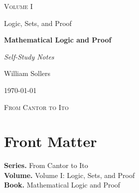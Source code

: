 \documentclass[12pt, a4paper]{report}
\begin{document}
\ExplSyntaxOff
\renewcommand{\familydefault}{\rmdefault}

\begin{titlepage}
\centering
\vspace*{3.5cm}

{\Large\scshape Volume I\par}
\vspace{0.35cm}
{\large Logic, Sets, and Proof\par}

\vspace{1.4cm}

{\Huge\bfseries Mathematical Logic and Proof\par}

\vspace{0.6cm}
{\large\itshape Self-Study Notes\par}

\vfill

{\large William Sollers\par}
\vspace{0.35cm}
{\large \today\par}

\vfill

{\large\scshape From Cantor to Ito\par}
\end{titlepage}

\clearpage
\thispagestyle{plain}
\chapter*{Front Matter}
\noindent\textbf{Series.} From Cantor to Ito\\[0.5em]
\textbf{Volume.} Volume I: Logic, Sets, and Proof\\[0.5em]
\textbf{Book.} Mathematical Logic and Proof

\clearpage
\tableofcontents
\clearpage
{}



\clearpage



\printindex[tech]
\printindex[dep]
\end{document}
